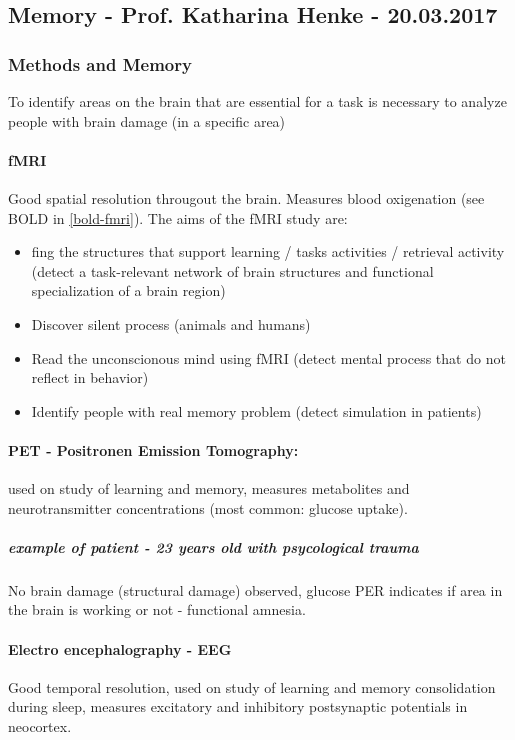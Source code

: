 \documentclass[12pt,article,oneside,a4paper]{memoir}
\begin{document}
\subsection{Memory - Prof. Katharina Henke - 20.03.2017}
\subsubsection{Methods and Memory}
To identify areas on the brain that are essential for a task is necessary to analyze people with brain damage (in a specific area)

\paragraph{fMRI} Good spatial resolution througout the brain. Measures blood oxigenation (see BOLD in \ref{bold-fmri}).
The aims of the fMRI study are:
\begin{itemize}
\item fing the structures that support learning / tasks activities / retrieval activity (detect a task-relevant network of brain structures and functional specialization of a brain region)
\item Discover silent process (animals and humans)
\item Read the unconscionous mind using fMRI (detect mental process that do not reflect in behavior)
\item Identify people with real memory problem (detect simulation in patients)
\end{itemize}

\paragraph{PET - Positronen Emission Tomography:} used on study of learning and memory, measures metabolites and neurotransmitter concentrations (most common: glucose uptake).
\subparagraph{example of patient - 23 years old with psycological trauma} No brain damage (structural damage) observed, glucose PER indicates if area in the brain is working or not - functional amnesia.

\paragraph{Electro encephalography - EEG} Good temporal resolution, used on study of learning and memory consolidation during sleep, measures excitatory and inhibitory postsynaptic potentials in neocortex.
\end{document}
